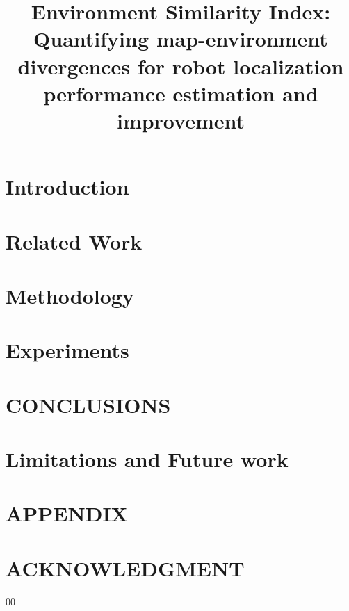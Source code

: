 \documentclass[letterpaper, 10 pt, conference]{ieeeconf}  %
\title{ \LARGE \textbf{Environment Similarity Index: Quantifying map-environment divergences for robot localization performance estimation and improvement}}
\begin{document}
\maketitle
\thispagestyle{empty}
\pagestyle{empty}



\section{Introduction}


\section{Related Work}


\section{Methodology}
 

\section{Experiments}


\section{CONCLUSIONS}


\section{Limitations and Future work}


\section*{APPENDIX}


\section*{ACKNOWLEDGMENT}

\begin{thebibliography}{00}

\end{thebibliography}
\end{document}

